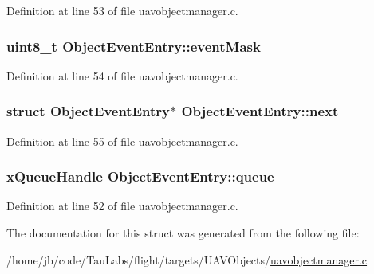 \-Definition at line 53 of file uavobjectmanager.\-c.

\hypertarget{struct_object_event_entry_a7943bff77f5f644659a1cb59d7f0b176}{
\subsubsection[{event\-Mask}]{\setlength{\rightskip}{0pt plus 5cm}uint8\-\_\-t {\bf \-Object\-Event\-Entry\-::event\-Mask}}}\label{struct_object_event_entry_a7943bff77f5f644659a1cb59d7f0b176}


\-Definition at line 54 of file uavobjectmanager.\-c.

\hypertarget{struct_object_event_entry_af10cb19d61193416975d2cb2c78bf620}{
\subsubsection[{next}]{\setlength{\rightskip}{0pt plus 5cm}struct {\bf \-Object\-Event\-Entry}$\ast$ {\bf \-Object\-Event\-Entry\-::next}}}\label{struct_object_event_entry_af10cb19d61193416975d2cb2c78bf620}


\-Definition at line 55 of file uavobjectmanager.\-c.

\hypertarget{struct_object_event_entry_a458a6b3068168aff7f61a922a5011673}{
\subsubsection[{queue}]{\setlength{\rightskip}{0pt plus 5cm}x\-Queue\-Handle {\bf \-Object\-Event\-Entry\-::queue}}}\label{struct_object_event_entry_a458a6b3068168aff7f61a922a5011673}


\-Definition at line 52 of file uavobjectmanager.\-c.



\-The documentation for this struct was generated from the following file\-:\begin{DoxyCompactItemize}
\item 
/home/jb/code/\-Tau\-Labs/flight/targets/\-U\-A\-V\-Objects/\hyperlink{uavobjectmanager_8c}{uavobjectmanager.\-c}\end{DoxyCompactItemize}
